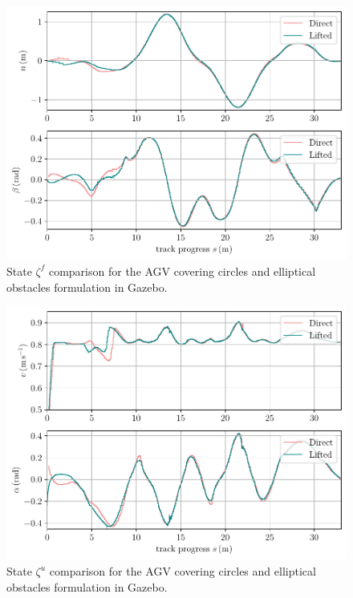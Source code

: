\begin{figure}[h!tb]
    \includegraphics[width=1\textwidth]{figures/experiments/zeta_f}
    \caption{State $\zeta^{f}$ comparison for the \ac{AGV} covering circles and elliptical obstacles formulation in Gazebo.}  \label{fig_comp_zeta_f}
\end{figure}

\begin{figure}[h!tb]
    \includegraphics[width=1\textwidth]{figures/experiments/zeta_u}
    \caption{State $\zeta^{u}$ comparison for the \ac{AGV} covering circles and elliptical obstacles formulation in Gazebo.}  \label{fig_comp_zeta_u}
\end{figure}

